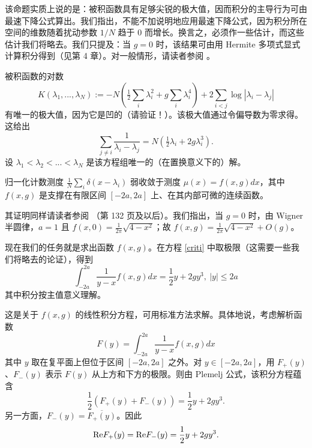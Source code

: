 该命题实质上说的是：被积函数具有足够尖锐的极大值，因而积分的主导行为可由最速下降公式算出。我们指出，不能不加说明地应用最速下降公式，因为积分所在空间的维数随着扰动参数 $1/N$ 趋于 $0$ 而增长。换言之，必须作一些估计，而这些估计我们将略去。我们只提及：当 $g=0$ 时，该结果可由用 Hermite 多项式显式计算积分得到（见第 4 章）。对一般情形，请读者参阅 \cite{De}。

被积函数的对数
$$
K(\lambda_1,...,\lambda_N):=
-N(\tfrac{1}{2}\sum_i \lambda_i^2+g\sum_i \lambda_i^4)+2\sum_{i<j}\log|\lambda_i-\lambda_j|
$$  
有唯一的极大值，因为它是凹的（请验证！）。该极大值通过令偏导数为零求得。这给出
\begin{equation}\label{criti}
\sum_{j\ne i}\frac{1}{\lambda_i-\lambda_j}=N(\tfrac{1}{2}\lambda_i+2g\lambda_i^3).
\end{equation}
设 $\lambda_1<\lambda_2<...<\lambda_N$ 是该方程组唯一的（在置换意义下的）解。

\begin{proposition}
归一化计数测度 $\frac{1}{N}\sum_i \delta(x-\lambda_i)$ 弱收敛于测度 $\mu(x)=f(x,g)dx$，其中 $f(x,g)$ 是支撑在有限区间 $[-2a,2a]$ 上、在其内部可微的连续函数。
\end{proposition}

其证明同样请读者参阅 \cite{De}（第 132 页及以后）。我们指出，当 $g=0$ 时，由 Wigner 半圆律，$a=1$ 且
$f(x,0)=\frac{1}{2\pi}\sqrt{4-x^2}$；故 $f(x,g)=
\frac{1}{2\pi}\sqrt{4-x^2}+O(g)$。

现在我们的任务就是求出函数 $f(x,g)$。在方程 \eqref{criti} 中取极限（这需要一些我们将略去的论证），得到
$$
\int_{-2a}^{2a}\frac{1}{y-x}f(x,g)dx=\frac{1}{2}y+2gy^3,\ |y|\le 2a
$$
其中积分按主值意义理解。

这是关于 $f(x,g)$ 的线性积分方程，可用标准方法求解。具体地说，考虑解析函数
$$
F(y)=\int_{-2a}^{2a}\frac{1}{y-x}f(x,g)dx
$$ 
其中 $y$ 取在复平面上但位于区间 $[-2a,2a]$ 之外。对 $y\in [-2a,2a]$，用 $F_+(y)$、$F_-(y)$ 表示 $F(y)$ 从上方和下方的极限。则由 Plemelj 公式，该积分方程蕴含
$$
\frac{1}{2}(F_+(y)+F_-(y))=\frac{1}{2}y+2gy^3.
$$
另一方面，$F_-(y)=\overline{F_+(y)}$。因此
$$
{\rm Re}F_+(y)={\rm Re}F_-(y)=\frac{1}{2}y+2gy^3.
$$ 

